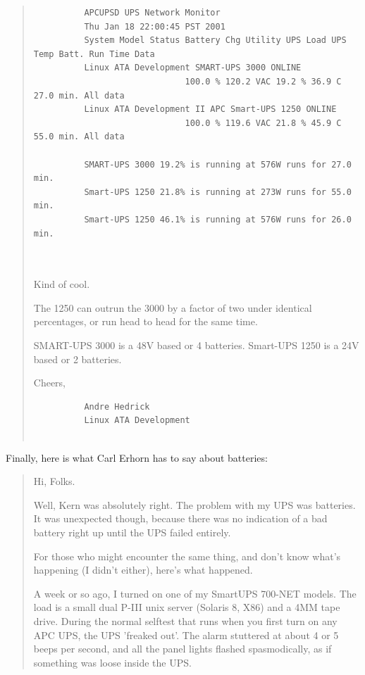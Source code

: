 {{{{{{\begin{quote}
\begin{verbatim}
          APCUPSD UPS Network Monitor
          Thu Jan 18 22:00:45 PST 2001
          System Model Status Battery Chg Utility UPS Load UPS Temp Batt. Run Time Data
          Linux ATA Development SMART-UPS 3000 ONLINE
                              100.0 % 120.2 VAC 19.2 % 36.9 C 27.0 min. All data
          Linux ATA Development II APC Smart-UPS 1250 ONLINE
                              100.0 % 119.6 VAC 21.8 % 45.9 C 55.0 min. All data
          
          SMART-UPS 3000 19.2% is running at 576W runs for 27.0 min.
          Smart-UPS 1250 21.8% is running at 273W runs for 55.0 min.
          Smart-UPS 1250 46.1% is running at 576W runs for 26.0 min.
          
     
\end{verbatim}
\normalsize

Kind of cool.  

The 1250 can outrun the 3000 by a factor of two under identical percentages,
or run head to head for the same time.  

SMART-UPS 3000 is a 48V based or 4 batteries.  Smart-UPS 1250 is a 24V based
or 2 batteries.  

Cheers,  

\footnotesize
\begin{verbatim}
          Andre Hedrick
          Linux ATA Development
     
\end{verbatim}
\normalsize

\end{quote}

Finally, here is what Carl Erhorn has to say about batteries:  

\begin{quote}

Hi, Folks.  

Well, Kern was absolutely right. The problem with my UPS was batteries. It was
unexpected though, because there was no indication of a bad battery right up
until the UPS failed entirely.  

For those who might encounter the same thing, and don't know what's happening
(I didn't either), here's what happened.  

A week or so ago, I turned on one of my SmartUPS 700-NET models. The load is a
small dual P-III unix server (Solaris 8, X86) and a 4MM tape drive. During the
normal selftest that runs when you first turn on any APC UPS, the UPS 'freaked
out'. The alarm stuttered at about 4 or 5 beeps per second, and all the panel
lights flashed spasmodically, as if something was loose inside the UPS.  


\end{quote}}}}}}}
